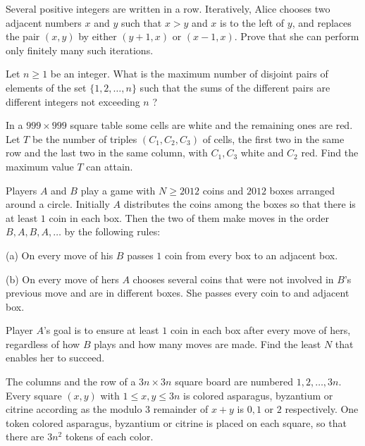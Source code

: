
\item[\textbf{C1.}]
Several positive integers are written in a row. Iteratively, Alice chooses two adjacent numbers 
$x$
 and 
$y$
 such that 
$x>y$
 and 
$x$
 is to the left of 
$y$, 
 and replaces the pair 
$(x,y)$
 by either 
$(y+1,x)$
 or 
$(x-1,x)$.
 Prove that she can perform only finitely many such iterations.

\item[\textbf{C2.}]
Let 
$n \geq 1$
 be an integer. What is the maximum number of disjoint pairs of elements of the set 
$\{ 1,2,\ldots , n \}$
 such that the sums of the different pairs are different integers not exceeding 
$n$
?

\item[\textbf{C3.}]
In a 
$999 \times 999$
 square table some cells are white and the remaining ones are red. Let 
$T$
 be the number of triples 
$(C_1,C_2,C_3)$
 of cells, the first two in the same row and the last two in the same column, with 
$C_1,C_3$
 white and 
$C_2$
 red. Find the maximum value 
$T$
 can attain.

\item[\textbf{C4.}]
Players 
$A$
 and 
$B$
 play a game with 
$N \geq 2012$
 coins and 
$2012$
 boxes arranged around a circle. Initially 
$A$
 distributes the coins among the boxes so that there is at least 
$1$
 coin in each box. Then the two of them make moves in the order 
$B,A,B,A,\ldots $
 by the following rules:
 
(a)
 On every move of his 
$B$
 passes 
$1$
 coin from every box to an adjacent box.
 
(b)
 On every move of hers 
$A$
 chooses several coins that were 
not
 involved in 
$B$'s previous move and are in different boxes. She passes every coin to and adjacent box.


Player 
$A$'s goal is to ensure at least 
$1$
 coin in each box after every move of hers, regardless of how 
$B$
 plays and how many moves are made. Find the least 
$N$
 that enables her to succeed.

\item[\textbf{C5.}]
The columns and the row of a 
$3n \times 3n$
 square board are numbered 
$1,2,\ldots ,3n$.
 Every square 
$(x,y)$
 with 
$1 \leq x,y \leq 3n$
 is colored asparagus, byzantium or citrine according as the modulo 
$3$
 remainder of 
$x+y$
 is 
$0,1$
 or 
$2$
 respectively. One token colored asparagus, byzantium or citrine is placed on each square, so that there are 
$3n^2$
 tokens of each color.


